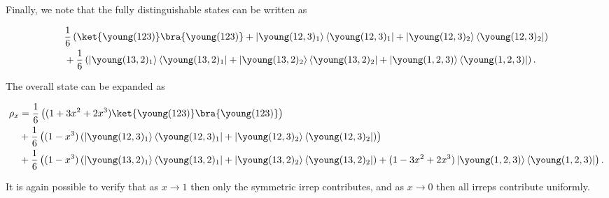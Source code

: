 Finally, we note that the fully distinguishable states can be written as

\begin{align}
&\frac{1}{6}\left(\ket{\young(123)}\bra{\young(123)} + \left|\young(12,3)_1\right\rangle\left\langle\young(12,3)_1\right| + \left|\young(12,3)_2\right\rangle\left\langle\young(12,3)_2\right|\right)\nonumber\\
&+\frac{1}{6}\left(\left|\young(13,2)_1\right\rangle\left\langle\young(13,2)_1\right| + \left|\young(13,2)_2\right\rangle\left\langle\young(13,2)_2\right| + \left|\young(1,2,3)\right\rangle\left\langle\young(1,2,3)\right|\right).
\end{align}

The overall state can be expanded as

\begin{align}
\rho_x &= \frac{1}{6}\left((1+3x^2+2x^3)\ket{\young(123)}\bra{\young(123)}\right)\nonumber\\
&+\frac{1}{6}\left((1-x^3)\left(\left|\young(12,3)_1\right\rangle\left\langle\young(12,3)_1\right| + \left|\young(12,3)_2\right\rangle\left\langle\young(12,3)_2\right|\right)\right)\nonumber\\
&+\frac{1}{6}\left((1-x^3)\left(\left|\young(13,2)_1\right\rangle\left\langle\young(13,2)_1\right| + \left|\young(13,2)_2\right\rangle\left\langle\young(13,2)_2\right|\right) + (1-3x^2+2x^3)\left|\young(1,2,3)\right\rangle\left\langle\young(1,2,3)\right|\right).
\end{align}

It is again possible to verify that as $x\rightarrow 1$ then only the symmetric irrep contributes, and as $x \rightarrow 0$ then all irreps contribute uniformly.

